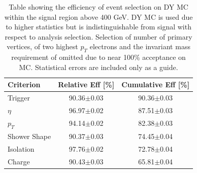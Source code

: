    \begin {table}[h]
      \begin{center}
      \begin{tabular}{|l|c|c|}
         \hline
         \hline
         Criterion & Relative Eff [\%] & Cumulative Eff [\%] \\
         \hline
         Trigger & 90.36$\pm$0.03 & 90.36$\pm$0.03 \\
         $\eta$ & 96.97$\pm$0.02 & 87.51$\pm$0.03 \\
         $p_{T}$ & 94.14$\pm$0.02 & 82.38$\pm$0.03 \\
         Shower Shape & 90.37$\pm$0.03 & 74.45$\pm$0.04 \\
         Isolation & 97.76$\pm$0.02 & 72.78$\pm$0.04 \\
         Charge & 90.43$\pm$0.03 & 65.81$\pm$0.04 \\
         \hline
         \hline
      \end{tabular}
      \caption{Table showing the efficiency of event selection on DY MC within the signal region above 400 GeV. DY MC is used due to higher statistics but is indistinguishable from signal with respect to analysis selection. Selection of number of primary vertices, of two highest $p_{T}$ electrons and the invariant mass requirement of omitted due to near 100\% acceptance on MC. Statistical errors are included only as a guide.}
      \label{tab:eventEff}
      \end{center}
   \end {table}





